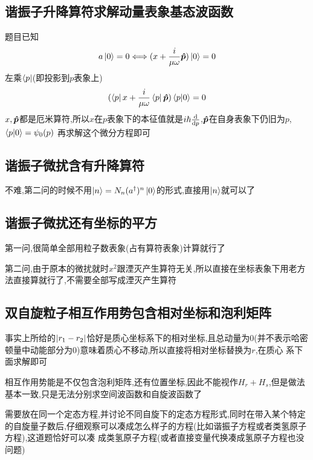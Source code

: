 \documentclass{article}
\begin{document}
        \subsection{谐振子升降算符求解动量表象基态波函数}
            题目已知
            $$
            a \ket{0} = 0 \Longleftrightarrow (x + \frac{i}{\mu \omega} \vu*{p}) \ket{0} = 0
            $$
            左乘$\bra{p}$(即投影到$p$表象上)
            $$
            (\bra{p}x + \frac{i}{\mu \omega} \bra{p}\vu*{p}) \braket{p}{0} = 0
            $$
            $x,\vu*{p}$都是厄米算符,所以$x$在$p$表象下的本征值就是$i\hbar \dv{p} $,$\vu*{p}$在自身表象下仍旧为$p$,$\braket{p}{0} = \psi_{0}(p)$
            再求解这个微分方程即可                                                                                                                                                                                                                                                   


        \subsection{谐振子微扰含有升降算符}
            不难,第二问的时候不用$\ket{n} = N_{n} (a^{\dagger})^{n} \ket{0}$的形式,直接用$\ket{n}$就可以了

        \subsection{谐振子微扰还有坐标的平方}
            第一问,很简单全部用粒子数表象(占有算符表象)计算就行了

            第二问,由于原本的微扰就时$x^{2}$跟湮灭产生算符无关,所以直接在坐标表象下用老方法直接算就行了,不需要全部写成湮灭产生算符
        
        \subsection{双自旋粒子相互作用势包含相对坐标和泡利矩阵}
            

            事实上所给的$\abs{r_{1}-r_{2}}$恰好是质心坐标系下的相对坐标,且总动量为0(并不表示哈密顿量中动能部分为0)意味着质心不移动,所以直接将相对坐标替换为$r$,在质心
            系下面求解即可
            
            相互作用势能是不仅包含泡利矩阵,还有位置坐标,因此不能视作$H_{r}+H_{s}$,但是做法基本一致,只是无法分别求空间波函数和自旋波函数了

            需要放在同一个定态方程,并讨论不同自旋下的定态方程形式,同时在带入某个特定的自旋量子数后,仔细观察可以凑成怎么样子的方程(比如谐振子方程或者类氢原子方程),这道题恰好可以凑
            成类氢原子方程(或者直接变量代换凑成氢原子方程也没问题)
\end{document}
